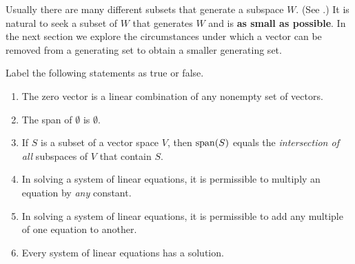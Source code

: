 \begin{remark} \label{remark 1.4.1}
Usually there are many different subsets that generate a subspace \(W\). (See .)
It is natural to seek a subset of \(W\) that generates \(W\) and is \textbf{as small as possible}.
In the next section we explore the circumstances under which a vector can be removed from a generating set to obtain a smaller generating set.
\end{remark}

\exercisesection

\begin{exercise} \label{exercise 1.4.1}
Label the following statements as true or false.
\begin{enumerate}
\item The zero vector is a linear combination of any nonempty set of vectors.
\item The span of \(\emptyset\) is \(\emptyset\).
\item If \(S\) is a subset of a vector space \(V\), then \(\operatorname{span}(S)\) equals the \emph{intersection of all} subspaces of \(V\) that contain \(S\).
\item In solving a system of linear equations, it is permissible to multiply an equation by \emph{any} constant.
\item In solving a system of linear equations, it is permissible to add any multiple of one equation to another.
\item Every system of linear equations has a solution. 
\end{enumerate}
\end{exercise}

